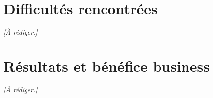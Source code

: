 \section{Difficultés rencontrées}
\emph{[À rédiger.]}

\section{Résultats et bénéfice business}
\emph{[À rédiger.]}
